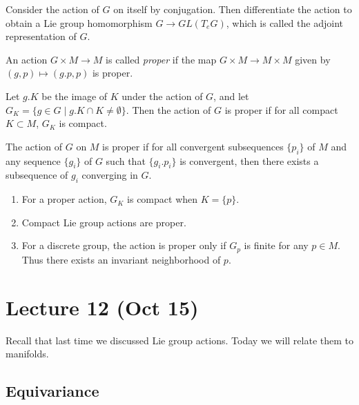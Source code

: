 \documentclass[twoside, 10pt]{article}
\begin{document}
    \begin{exm} Consider the action of $G$ on itself by conjugation. Then
    differentiate the action to obtain a Lie group homomorphism $G \to
GL(T_eG)$, which is called the adjoint representation of $G$.  \end{exm}

    \begin{defn} An action $G \times M \to M$ is called \textit{proper} if the
    map $G \times M \to M \times M$ given by $(g,p) \mapsto (g.p,p)$ is proper.
\end{defn}

    \begin{prop} Let $g.K$ be the image of $K$ under the action of $G$, and let
    $G_K = \{g \in G \mid g.K \cap K \neq \emptyset \}$. Then the action of $G$
is proper if for all compact $K \subset M$, $G_K$ is compact.  \end{prop}
    
    \begin{prop} The action of $G$ on $M$ is proper if for all convergent
    subsequences $\{p_i\}$ of $M$ and any sequence $\{g_i\}$ of $G$ such that
$\{g_i.p_i\}$ is convergent, then there exists a subsequence of $g_i$
converging in $G$.  \end{prop}

    \begin{rmk} \begin{enumerate} \item For a proper action, $G_K$ is compact
        when $K = \{p\}$.  \item Compact Lie group actions are proper.  \item
        For a discrete group, the action is proper only if $G_p$ is finite for
        any $p \in M$. Thus there exists an invariant neighborhood of $p$.
\end{enumerate} \end{rmk}

    \section{Lecture 12 (Oct 15)}%

    Recall that last time we discussed Lie group actions. Today we will relate
    them to manifolds.

    \subsection{Equivariance}%
    
\end{document}
